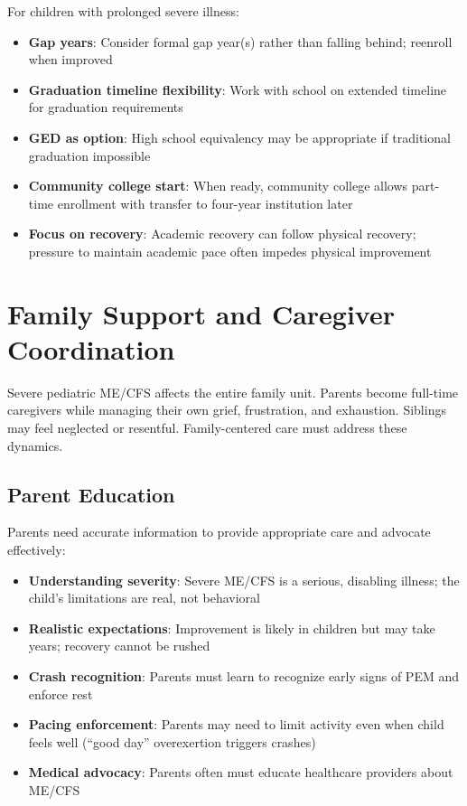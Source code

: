 For children with prolonged severe illness:

\begin{itemize}
    \item \textbf{Gap years}: Consider formal gap year(s) rather than falling behind; reenroll when improved
    \item \textbf{Graduation timeline flexibility}: Work with school on extended timeline for graduation requirements
    \item \textbf{GED as option}: High school equivalency may be appropriate if traditional graduation impossible
    \item \textbf{Community college start}: When ready, community college allows part-time enrollment with transfer to four-year institution later
    \item \textbf{Focus on recovery}: Academic recovery can follow physical recovery; pressure to maintain academic pace often impedes physical improvement
\end{itemize}

\section{Family Support and Caregiver Coordination}
\label{sec:ped-severe-family}

Severe pediatric ME/CFS affects the entire family unit. Parents become full-time caregivers while managing their own grief, frustration, and exhaustion. Siblings may feel neglected or resentful. Family-centered care must address these dynamics.

\subsection{Parent Education}

Parents need accurate information to provide appropriate care and advocate effectively:

\begin{itemize}
    \item \textbf{Understanding severity}: Severe ME/CFS is a serious, disabling illness; the child's limitations are real, not behavioral
    \item \textbf{Realistic expectations}: Improvement is likely in children but may take years; recovery cannot be rushed
    \item \textbf{Crash recognition}: Parents must learn to recognize early signs of PEM and enforce rest
    \item \textbf{Pacing enforcement}: Parents may need to limit activity even when child feels well (``good day'' overexertion triggers crashes)
    \item \textbf{Medical advocacy}: Parents often must educate healthcare providers about ME/CFS
\end{itemize}

